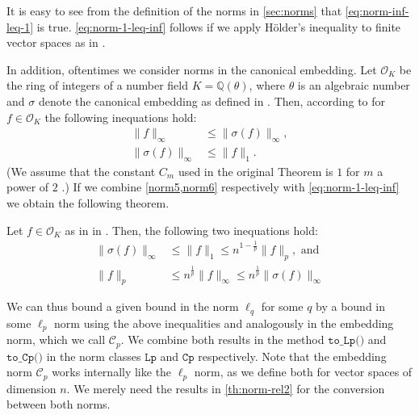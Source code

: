 It is easy to see from the definition of the norms in \cref{sec:norms} that \cref{eq:norm-inf-leq-1} is true. \cref{eq:norm-1-leq-inf} follows if we apply Hölder's inequality to finite vector spaces as in \cite{norm-relations}.

In addition, oftentimes we consider norms in the canonical embedding. Let $\mathcal{O}_K$ be the ring of integers of a number field $K=\mathbb{Q}(\theta)$, where $\theta$ is an algebraic number and $\sigma$ denote the canonical embedding as defined in \cite{DPSZ12}. Then, according to \cite[Theorem~7]{DPSZ12} for $f \in \mathcal{O}_K$  the following inequations hold: %
\begin{align}
    \| f \|_\infty         & \leq \| \sigma(f) \|_\infty \label{norm5}, \\
    \| \sigma(f) \|_\infty & \leq \| f \|_1 \label{norm6}.
\end{align}
(We assume that the constant $C_m$ used in the original Theorem is $1$ for $m$ a power of $2$ \cite[Lemma~3]{DPSZ12}.) If we combine \cref{norm5,norm6} respectively with \cref{eq:norm-1-leq-inf} we obtain the following theorem.
\begin{theorem}\label{th:norm-rel2}
    Let $f \in \mathcal{O}_K$ as in in \cite{DPSZ12}. Then, the following two inequations hold:
    \begin{align}
        \| \sigma(f) \|_\infty & \leq \| f \|_1 \leq n^{1 - \frac{1}{p}} \| f \|_p, \text{ and } \label{eq:Coo-norm}             \\
        \| f \|_p              & \leq  n^{\frac{1}{p}} \| f \|_\infty \leq n^{\frac{1}{p}}  \| \sigma(f) \|_\infty \label{norm7}
    \end{align}
\end{theorem}
We can thus bound a given bound in the norm $\ell_q$ for some $q$ by a bound in some $\ell_p$ norm using the above inequalities and analogously in the embedding norm, which we call $\mathcal{C}_p$. We combine both results in the method $\texttt{to\_Lp()}$ and $\texttt{to\_Cp()}$ in the norm classes $\texttt{Lp}$ and $\texttt{Cp}$ respectively. Note that the embedding norm $\mathcal{C}_p$ works internally like the $\ell_p$ norm, as we define both for vector spaces of dimension $n$. We merely need the results in \cref{th:norm-rel2} for the conversion between both norms.

